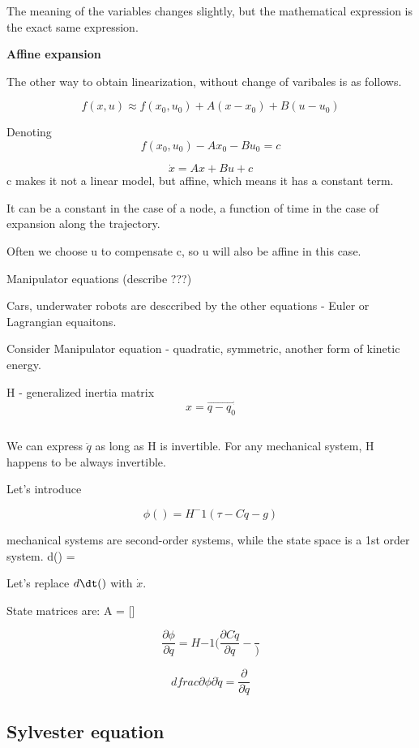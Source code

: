 The meaning of the variables changes slightly, but the mathematical expression is the exact same expression. 


\textbf{Affine expansion}

The other way to obtain linearization, without change of varibales is as follows. 

\[f(x, u) \approx f(x_0, u_0) + A(x-x_0) + B(u-u_0) \]

Denoting \[f(x_0, u_0) - Ax_0 - Bu_0 = c\]

\[\dot x = Ax+ Bu+ c\]
c makes it not a linear model, but affine, which means it has a constant term.

It can be a constant in the case of a node, \omegar a function of time in the case of expansion along the trajectory.


Often we choose u to compensate c, so u will also be affine in this case. 


Manipulator equations (describe ???)


Cars, underwater robots are desccribed by the other equations - Euler or Lagrangian equaitons. 

Consider  Manipulator equation - quadratic, symmetric, another form of kinetic energy. 
\[ \]

H - generalized inertia matrix 
\[x = \vec{q - q_0}\]

\[\] 

We can express $\ddot q$ as long as H is invertible.
For any mechanical system, H happens to be always invertible. 


Let's introduce 

\[\phi() = H^-1 (\tau - C \dot q - g)\]

mechanical systems are second-order systems, while the state space is a 1st order system. 
d\dt() = 

Let's replace $d\dt()$ with $\dot x$. 

State matrices are:
A = []


\[\dfrac{\partial \phi}{\partial q} = H{-1} (\dfrac{\partial C \dot q}{\partial q} -\dfrac{})\]

\[dfrac{\partial \phi}{\partial \dot q} = \dfrac{\partial}{\partial \dot q}\]



\subsection{Sylvester equation}

